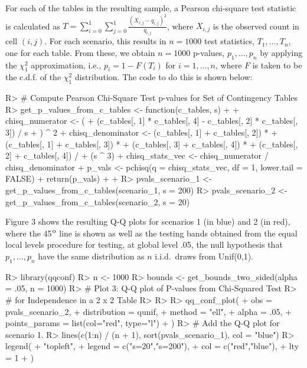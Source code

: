 \documentclass[article]{jss}
\begin{document}
For each of the tables in the resulting sample, a Pearson chi-square test statistic is calculated as $T = \sum_{i=0}^1\sum_{j=0}^1 \frac{(X_{i,j}-q_{i,j})^2}{q_{i,j}}$, where $X_{i,j}$ is the observed count in cell $(i,j)$.  For each scenario, this results in $n=1000$ test statistics, $T_1, \ldots, T_n$, one for each table.  From these, we obtain $n=1000$ p-values, $p_1, \ldots, p_n$ by applying the $\chi^2_1$ approximation, i.e., $p_i = 1-F(T_i)$ for $i=1,\ldots, n$, where $F$ is taken to be the c.d.f. of the $\chi^2_1$ distribution. The code to do this is shown below:

%
\begin{Schunk}
\begin{Sinput}
R> # Compute Pearson Chi-Square Test p-values for Set of Contingency Tables
R> get_p_values_from_c_tables <- function(c_tables, s) {
+    
+    chisq_numerator <- (
+      (c_tables[, 1] * c_tables[, 4] - c_tables[, 2] * c_tables[, 3]) / s
+    ) ^ 2
+    chisq_denominator <- (c_tables[, 1] + c_tables[, 2]) * 
+      (c_tables[, 1] + c_tables[, 3]) * 
+      (c_tables[, 3] + c_tables[, 4]) * 
+      (c_tables[, 2] + c_tables[, 4]) / 
+      (s ^ 3)
+    chisq_stats_vec <- chisq_numerator / chisq_denominator
+    p_vals <- pchisq(q = chisq_stats_vec, df = 1, lower.tail = FALSE)
+    return(p_vals)
+    
+  }
R> pvals_scenario_1 <- get_p_values_from_c_tables(scenario_1, s = 200)
R> pvals_scenario_2 <- get_p_values_from_c_tables(scenario_2, s = 20)
\end{Sinput}
\end{Schunk}
%


Figure 3 shows the resulting Q-Q plots for scenarios 1 (in blue) and 2 (in red), where the 45$^{\mbox{\footnotesize o}}$ line is shown as well as the testing bands obtained from the equal local levels procedure for testing, at global level .05, the null hypothesis that $p_1, \ldots, p_n$ have the same distribution as $n$ i.i.d.\ draws from Unif(0,1).  

\begin{Schunk}
\begin{Sinput}
R> library(qqconf)
R> n <- 1000
R> bounds <- get_bounds_two_sided(alpha = .05, n = 1000)
R> # Plot 3: Q-Q plot of P-values from Chi-Squared Test
R> # for Independence in a 2 x 2 Table
R> 
R> 
R> qq_conf_plot(
+    obs = pvals_scenario_2,
+    distribution = qunif,
+    method = "ell",
+    alpha = .05,
+    points_params = list(col="red", type="l")
+  )
R> # Add the Q-Q plot for scenario 1.
R> lines(c(1:n) / (n + 1), sort(pvals_scenario_1), col = "blue")
R> legend(
+    "topleft", 
+    legend = c("s=20","s=200"), 
+    col = c("red","blue"), 
+    lty = 1
+  )
\end{Sinput}
\end{Schunk}
\end{document}
